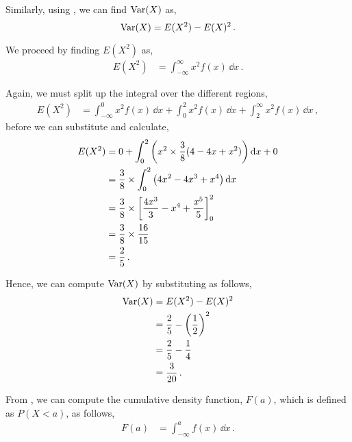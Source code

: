 \begin{subquestions}
\begin{subsubquestions}
Similarly, using , we can find $\text{Var}(X)$ as,
\begin{equation}
  \text{Var}(X) = E(X^2)- E(X)^2 \,.
\end{equation}

We proceed by finding $E(X^2)$ as,
\begin{align}
  E(X^2) & = \int_{-\infty}^{\infty}x^2 f(x)\,\dd x \,.
\end{align}

Again, we must split up the integral over the different regions,
\begin{align}
  E(X^2) & = \int_{-\infty}^{0}x^2 f(x)\,\dd x+\int_{0}^{2}x^2 f(x)\,\dd x+\int_{2}^{\infty}x^2 f(x)\,\dd x \,,
\end{align}
before we can substitute and calculate,
\begin{align}
  E(X^2) & = 0 + \int_{0}^{2} \left(x^2 \times \frac{3}{8}(4-4x+x^2)\right)\mathrm{d}x + 0 \nonumber \\
  		 & = \frac{3}{8} \times \int_{0}^{2} \left(4x^2-4x^3+x^4\right)\mathrm{d}x  \nonumber \\
  		 & = \frac{3}{8} \times \left[ \frac{4x^3}{3} - x^4 + \frac{x^5}{5}\right]_0^2  \nonumber \\
  		 & = \frac{3}{8} \times \frac{16}{15}\nonumber \\
  		 & = \frac{2}{5}\,.
\end{align}
  
Hence, we can compute $\text{Var}(X)$ by substituting as follows,
\begin{align}
  		\text{Var}(X) & = E(X^2)- E(X)^2 \nonumber \\
         & = \frac{2}{5} - \left(\frac{1}{2}\right)^2 \nonumber \\
         & = \frac{2}{5} - \frac{1}{4} \nonumber \\
         & = \frac{3}{20} \,.
\end{align}


\subsubquestion

From , we can compute the cumulative density function, $F(a)$, which is defined as $P(X<a)$, as follows,
\begin{align}
	F(a) & = \int_{-\infty}^{a} f(x)\,\dd x \,.
\end{align}


\end{subsubquestions}
\end{subquestions}
